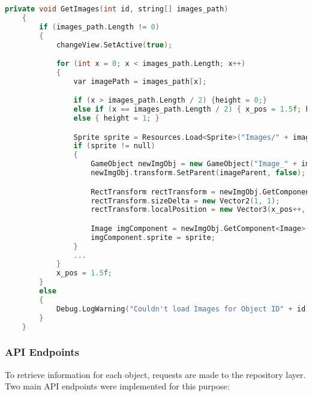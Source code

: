 \begin{lstlisting}[language=C++, caption={Method used to load artifact images and to display them in the Images Gallery.}, label={lst:artifact_images}]
      private void GetImages(int id, string[] images_path)
    {
        if (images_path.Length != 0)
        {
            changeView.SetActive(true);

            for (int x = 0; x < images_path.Length; x++)
            {
                var imagePath = images_path[x];

                if (x > images_path.Length / 2) {height = 0;}
                else if (x == images_path.Length / 2) { x_pos = 1.5f; height = 0; }
                else { height = 1; }

                Sprite sprite = Resources.Load<Sprite>("Images/" + imagePath);
                if (sprite != null)
                {
                    GameObject newImgObj = new GameObject("Image_" + imagePath, typeof(RectTransform), typeof(CanvasRenderer), typeof(Image));
                    newImgObj.transform.SetParent(imageParent, false);

                    RectTransform rectTransform = newImgObj.GetComponent<RectTransform>();
                    rectTransform.sizeDelta = new Vector2(1, 1);
                    rectTransform.localPosition = new Vector3(x_pos++, height, 0);

                    Image imgComponent = newImgObj.GetComponent<Image>();
                    imgComponent.sprite = sprite;
                }
                ...
            }
            x_pos = 1.5f;
        }
        else
        {
            Debug.LogWarning("Couldn't load Images for Object ID" + id);
        }
    }
\end{lstlisting}


\subsubsection{API Endpoints}

To retrieve information for each object, requests are made to the repository layer. 
Two main API endpoints were implemented for this purpose:

